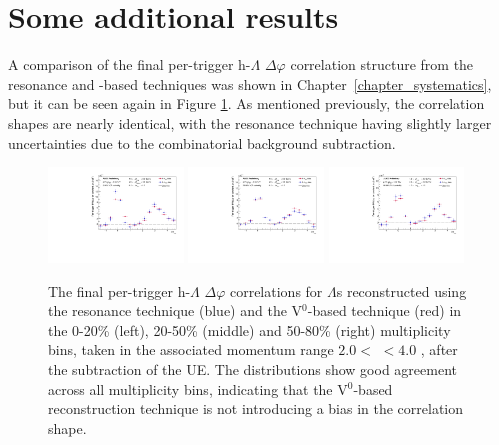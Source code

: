 \section{Some additional results}


A comparison of the final per-trigger h-$\Lambda$ $\Delta\varphi$ correlation structure from the resonance and \vz-based techniques was shown in Chapter~\ref{chapter_systematics}, but it can be seen again in Figure \ref{fig:resonance_v0_dphi_comp_2}. As mentioned previously, the correlation shapes are nearly identical, with the resonance technique having slightly larger uncertainties due to the combinatorial background subtraction. 

\begin{figure}[h]
    \centering
    \includegraphics[width=0.32\textwidth]{figures/analysis/h_lambda_dphi_0_20_zeroed_rescomp.pdf}
    \includegraphics[width=0.32\textwidth]{figures/analysis/h_lambda_dphi_20_50_zeroed_rescomp.pdf}
    \includegraphics[width=0.32\textwidth]{figures/analysis/h_lambda_dphi_50_80_zeroed_rescomp.pdf}
    \caption{The final per-trigger h-$\Lambda$ $\Delta\varphi$ correlations for $\Lambda$s reconstructed using the resonance technique (blue) and the V$^{0}$-based technique (red) in the 0-20\% (left), 20-50\% (middle) and 50-80\% (right) multiplicity bins, taken in the associated momentum range $2.0 <$ \pt $< 4.0$ \GeVc, after the subtraction of the UE. The distributions show good agreement across all multiplicity bins, indicating that the V$^{0}$-based reconstruction technique is not introducing a bias in the correlation shape.}
    \label{fig:resonance_v0_dphi_comp_2}
\end{figure}

